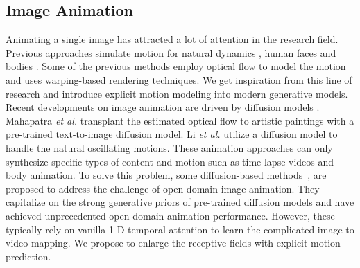 \documentclass[10pt,twocolumn,letterpaper]{article}
\begin{document}
\subsection{Image Animation} Animating a single image has attracted a lot of attention in the research field. Previous approaches simulate motion for natural dynamics \cite{Holynski_2021_CVPR, li2023_3dcinemagraphy, mahapatra2021controllable, Okabe2009AnimatingPO,Xiong_2018_CVPR,rottshaham2019singan,Animating_cloud}, human faces \cite{wang2020ImaGINator,wang2022latent,geng_facialanimation} and bodies \cite{Weng2018PhotoW3,wang2022latent,siarohin2021motion,karras2023dreampose,Blattmann2021Understanding}. Some of the previous methods employ optical flow to model the motion and uses warping-based rendering techniques. We get inspiration from this line of research and introduce explicit motion modeling into modern generative models. Recent developments on image animation are driven by diffusion models \cite{rombach2021highresolution,ho2020denoising,song2021denoising}. Mahapatra \textit{et al.} \cite{mahapatra2023synthesizing} transplant the estimated optical flow to artistic paintings with a pre-trained text-to-image diffusion model. Li \textit{et al.} \cite{li2023generative} utilize a diffusion model to handle the natural oscillating motions. These animation approaches can only synthesize specific types of content and motion such as time-lapse videos and body animation. To solve this problem, some diffusion-based methods~\cite{xing2023dynamicrafter,2023i2vgenxl,2023videocomposer,zhang2023pia,dai2023finegrained}, are proposed to address the challenge of open-domain image animation. They capitalize on the strong generative priors of pre-trained diffusion models and have achieved unprecedented open-domain animation performance. However, these typically rely on vanilla 1-D temporal attention to learn the complicated image to video mapping. We propose to enlarge the receptive fields with explicit motion prediction.
\end{document}
